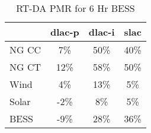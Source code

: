 \begin{table}[htbp]
\centering
\begin{tabular}{lccc}
\toprule
\hline
 & dlac-p & dlac-i & slac \\
\hline
\quad NG CC & 7\% & 50\% & 40\% \\
\quad NG CT & 12\% & 58\% & 50\% \\
\quad Wind & 4\% & 13\% & 5\% \\
\quad Solar & -2\% & 8\% & 5\% \\
\quad BESS & -9\% & 28\% & 36\% \\
\hline
\bottomrule
\end{tabular}
\caption{RT-DA PMR for 6 Hr BESS}
\label{tab:table4_6_Hr_BESS}
\end{table}
